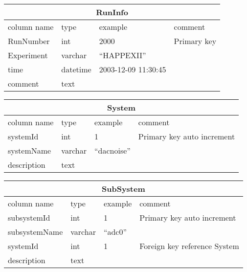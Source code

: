 \begin{slide*}

\centerline{}

\tiny

\begin{table}[htbp]
\begin{center}
\begin{tabular}{|l|l|l|l|} \hline
\multicolumn{4}{|c|}{RunInfo} \\ \hline
column name & type & example & comment \\ \hline\hline
RunNumber   & int        & 2000        & Primary key \\
Experiment  &  varchar   &  ``HAPPEXII'' &  \\
time        & datetime   &  2003-12-09 11:30:45&  \\
comment     & text       &             &  \\ \hline
\end{tabular}
\end{center}
\end{table}


\begin{table}[htbp]
\begin{center}
\begin{tabular}{|l|l|l|l|} \hline
\multicolumn{4}{|c|}{System} \\ \hline
column name & type & example & comment \\ \hline\hline
systemId    & int     & 1              & Primary key auto increment\\
systemName  & varchar & ``dacnoise'' &  \\
description & text    &                & \\ \hline
\end{tabular}
\end{center}
\end{table}


\begin{table}[htbp]
\begin{center}
\begin{tabular}{|l|l|l|l|} \hline
\multicolumn{4}{|c|}{SubSystem} \\ \hline
column name & type & example & comment \\ \hline\hline
subsystemId    & int     &  1           & Primary key auto increment\\
subsystemName  & varchar & ``adc0'' & \\
systemId       & int     &  1           & Foreign key reference System\\
description    & text    &              & \\ \hline
\end{tabular}
\end{center}
\end{table}



\end{slide*}
